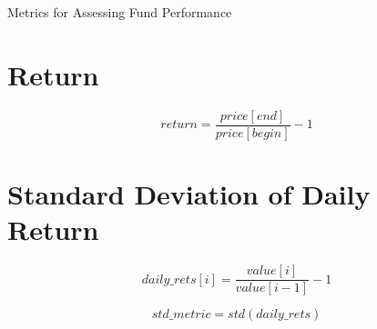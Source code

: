 \documentclass{article}
\begin{document}
    \centerline{\Large Metrics for Assessing Fund Performance}
    \section{Return}
    \begin{equation}
    return = \frac{price[end] }{price[begin]}- 1
    \end{equation}
    \section{Standard Deviation of Daily Return}
    
    \begin{equation}
        daily\_rets[i] = \frac{value[i]}{value[i-1]} -1 
    \end{equation} 
    
    \begin{equation}
        std\_metric = std(daily\_rets)
    \end{equation}
    
\end{document}
